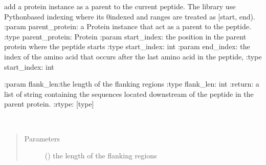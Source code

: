 \documentclass[letterpaper,10pt,english]{sphinxmanual}
\begin{document}
\begin{fulllineitems}
\begin{fulllineitems}
\label{\detokenize{IPTK.Classes:IPTK.Classes.Peptide.Peptide.add_parent_protein}}
add a protein instance as a parent to the current peptide. 
The library use Python\sphinxhyphen{}based indexing where its 0\sphinxhyphen{}indexed and ranges are treated as {[}start, end). 
:param parent\_protein: a Protein instance that act as a parent to the peptide.
:type parent\_protein: Protein 
:param start\_index: the position in the parent protein where the peptide starts
:type start\_index: int 
:param end\_index: the index of the amino acid that occurs after the last amino acid in the peptide, 
:type start\_index: int

\end{fulllineitems}


\begin{fulllineitems}
\label{\detokenize{IPTK.Classes:IPTK.Classes.Peptide.Peptide.get_c_terminal_flank_seq}}
:param flank\_len:the length of the flanking regions 
:type flank\_len: int
:return: a list of string containing the sequences located downstream of the peptide in the parent protein. 
:rtype: {[}type{]}

\end{fulllineitems}


\begin{fulllineitems}
\label{\detokenize{IPTK.Classes:IPTK.Classes.Peptide.Peptide.get_flanked_peptide}}~\begin{quote}\begin{description}
\item[{Parameters}] \leavevmode
{} () \textendash{} the length of the flanking regions


\end{description}
\end{quote}
\end{fulllineitems}
\end{fulllineitems}
\end{document}
